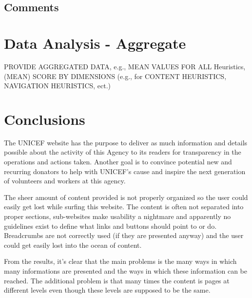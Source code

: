 \subsection{Comments}


\section{Data Analysis - Aggregate}
PROVIDE AGGREGATED DATA, e.g., MEAN VALUES FOR ALL Heuristics,
(MEAN) SCORE BY DIMENSIONS (e.g., for CONTENT HEURISTICS,
NAVIGATION HEURISTICS, ect.)

\section{Conclusions}
The UNICEF website has the purpose to deliver as much information and details possible about the activity of this Agency to its readers for transparency in the operations and actions taken. Another goal is to convince potential new and recurring donators to help with UNICEF's cause and inspire the next generation of volunteers and workers at this agency.

The sheer amount of content provided is not properly organized so the user could easily get lost while surfing this website. The content is often not separated into proper sections, sub-websites make usability a nightmare and apparently no guidelines exist to define what links and buttons should point to or do. Breadcrumbs are not correctly used (if they are presented anyway) and the user could get easily lost into the ocean of content.

From the results, it's clear that the main problems is the many ways in which many informations are presented and the ways in which these information can be reached. The additional problem is that many times the content is pages at different levels even though these levels are supposed to be the same.

